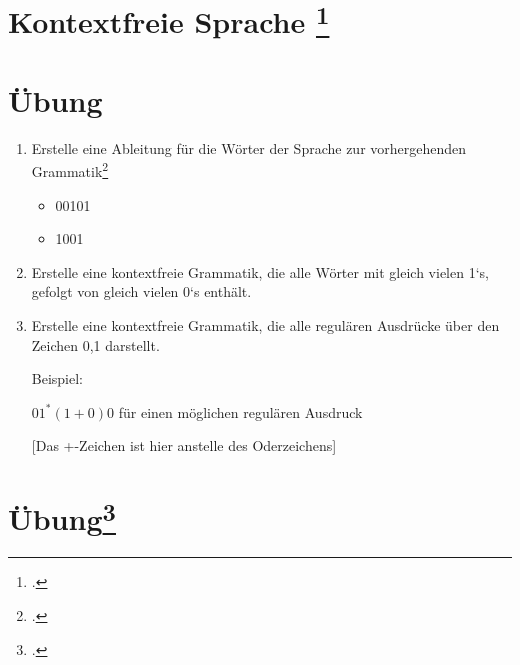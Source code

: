 \documentclass{lehramt-informatik-aufgabe}
\begin{document}
\section{Kontextfreie Sprache
\footcite{theo:fs:2}}

\section{Übung}
\begin{enumerate}
\item Erstelle eine Ableitung für die Wörter der Sprache zur
vorhergehenden Grammatik\footcite[Seite 10]{theo:fs:2}

\begin{itemize}
\item 00101
\item 1001
\end{itemize}

\item Erstelle eine kontextfreie Grammatik, die alle Wörter mit gleich
vielen 1‘s, gefolgt von gleich vielen 0‘s enthält.

\item Erstelle eine kontextfreie Grammatik, die alle regulären Ausdrücke
über den Zeichen 0,1 darstellt.

Beispiel:

$01^* (1 + 0)0$ für einen möglichen regulären Ausdruck

[Das +-Zeichen ist hier anstelle des Oderzeichens]

\end{enumerate}

%

\section{Übung\footcite[Seite 18]{theo:fs:2}}
\end{document}
